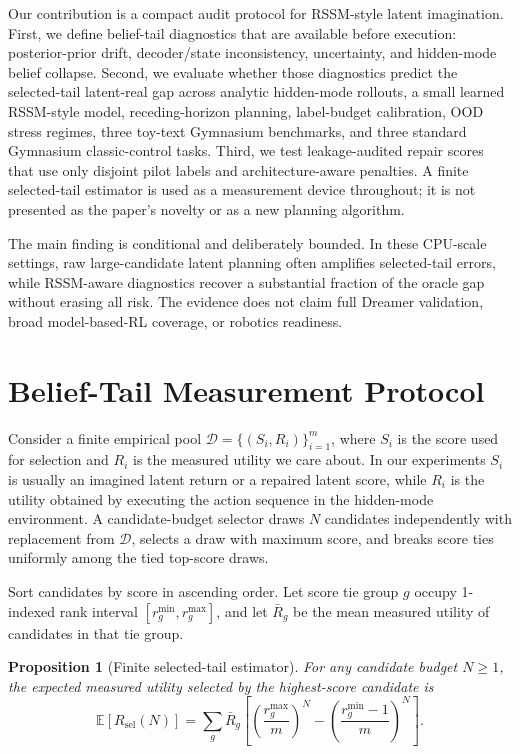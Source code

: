 \documentclass{article}
\newtheorem{proposition}{Proposition}
\newcommand{\score}{S}
\newcommand{\utility}{R}
\newcommand{\pool}{\mathcal{D}}
\newcommand{\Expect}{\mathbb{E}}
\newcommand{\rssm}{RSSM}
\begin{document}
Our contribution is a compact audit protocol for \rssm-style latent imagination. First, we define belief-tail diagnostics that are available before execution: posterior-prior drift, decoder/state inconsistency, uncertainty, and hidden-mode belief collapse. Second, we evaluate whether those diagnostics predict the selected-tail latent-real gap across analytic hidden-mode rollouts, a small learned \rssm-style model, receding-horizon planning, label-budget calibration, OOD stress regimes, three toy-text Gymnasium benchmarks, and three standard Gymnasium classic-control tasks. Third, we test leakage-audited repair scores that use only disjoint pilot labels and architecture-aware penalties. A finite selected-tail estimator is used as a measurement device throughout; it is not presented as the paper's novelty or as a new planning algorithm.

The main finding is conditional and deliberately bounded. In these CPU-scale settings, raw large-candidate latent planning often amplifies selected-tail errors, while RSSM-aware diagnostics recover a substantial fraction of the oracle gap without erasing all risk. The evidence does not claim full Dreamer validation, broad model-based-RL coverage, or robotics readiness.

\section{Belief-Tail Measurement Protocol}

Consider a finite empirical pool \(\pool=\{(\score_i,\utility_i)\}_{i=1}^m\), where \(\score_i\) is the score used for selection and \(\utility_i\) is the measured utility we care about. In our experiments \(\score_i\) is usually an imagined latent return or a repaired latent score, while \(\utility_i\) is the utility obtained by executing the action sequence in the hidden-mode environment. A candidate-budget selector draws \(N\) candidates independently with replacement from \(\pool\), selects a draw with maximum score, and breaks score ties uniformly among the tied top-score draws.

Sort candidates by score in ascending order. Let score tie group \(g\) occupy 1-indexed rank interval \([r_g^{\min}, r_g^{\max}]\), and let \(\bar{\utility}_g\) be the mean measured utility of candidates in that tie group.

\begin{proposition}[Finite selected-tail estimator]
\label{prop:tail-estimator}
For any candidate budget \(N\geq 1\), the expected measured utility selected by the highest-score candidate is
\begin{equation}
\label{eq:tail-estimator}
\Expect[\utility_{\mathrm{sel}}(N)]
= \sum_g \bar{\utility}_g
\left[
\left(\frac{r_g^{\max}}{m}\right)^N
- \left(\frac{r_g^{\min}-1}{m}\right)^N
\right].
\end{equation}
\end{proposition}
\end{document}
